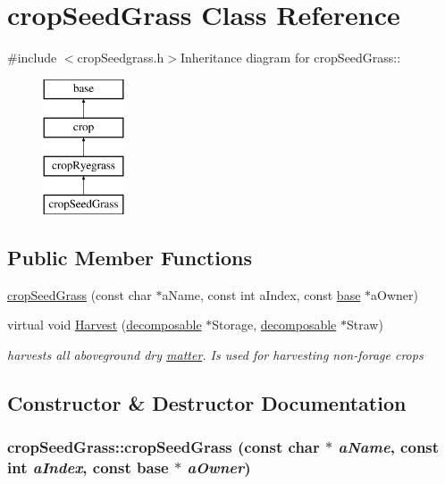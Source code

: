 \hypertarget{classcrop_seed_grass}{
\section{cropSeedGrass Class Reference}
\label{classcrop_seed_grass}
}


{\ttfamily \#include $<$cropSeedgrass.h$>$}Inheritance diagram for cropSeedGrass::\begin{figure}[H]
\begin{center}
\leavevmode
\includegraphics[height=4cm]{classcrop_seed_grass}
\end{center}
\end{figure}
\subsection*{Public Member Functions}
\begin{DoxyCompactItemize}
\item 
\hyperlink{classcrop_seed_grass_a787e13423fbca25789364a243abd126b}{cropSeedGrass} (const char $\ast$aName, const int aIndex, const \hyperlink{classbase}{base} $\ast$aOwner)
\item 
virtual void \hyperlink{classcrop_seed_grass_a3415f1b4d08da621709cbb07156137e0}{Harvest} (\hyperlink{classdecomposable}{decomposable} $\ast$Storage, \hyperlink{classdecomposable}{decomposable} $\ast$Straw)
\begin{DoxyCompactList}\small\item\em harvests all aboveground dry \hyperlink{classmatter}{matter}. Is used for harvesting non-\/forage crops \item\end{DoxyCompactList}\end{DoxyCompactItemize}


\subsection{Constructor \& Destructor Documentation}
\hypertarget{classcrop_seed_grass_a787e13423fbca25789364a243abd126b}{
\subsubsection[{cropSeedGrass}]{\setlength{\rightskip}{0pt plus 5cm}cropSeedGrass::cropSeedGrass (const char $\ast$ {\em aName}, \/  const int {\em aIndex}, \/  const {\bf base} $\ast$ {\em aOwner})}}
\label{classcrop_seed_grass_a787e13423fbca25789364a243abd126b}



